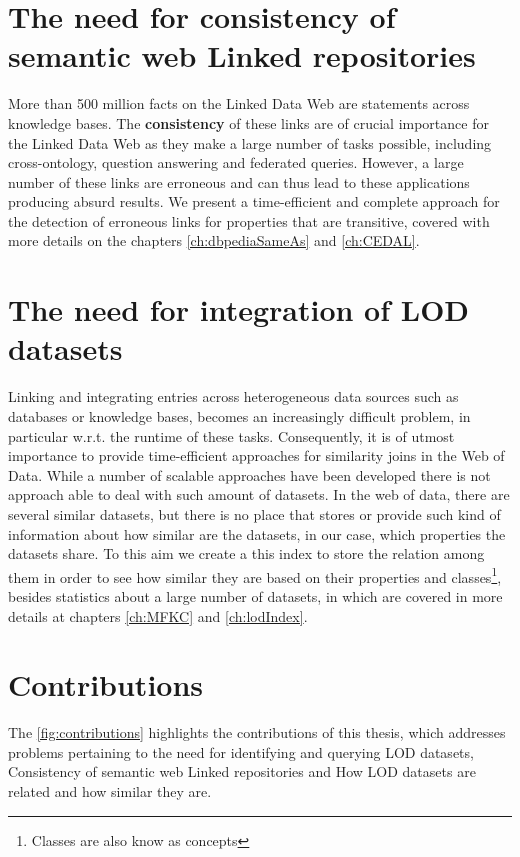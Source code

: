 \section{The need for consistency of semantic web Linked repositories}
More than 500 million facts on the Linked Data Web are statements across knowledge bases. The \textbf{consistency} of these links are of crucial importance for the Linked Data Web as they make a large number of tasks possible, including  cross-ontology, question answering and federated queries. However, a large number of these links are erroneous and can thus lead to these applications producing absurd results. We present a time-efficient and complete approach for the detection of erroneous links for properties that are transitive\cite{valdestilhasdbpediasameas, valdestilhas2017cedal}, covered with more details on the chapters \ref{ch:dbpediaSameAs} and \ref{ch:CEDAL}.

\section{The need for integration of LOD datasets}
Linking and integrating entries across heterogeneous data sources such as databases or knowledge bases, becomes an increasingly difficult problem, in particular w.r.t. the runtime of these tasks. Consequently, it is of utmost importance to provide time-efficient approaches for similarity joins in the Web of Data. While a number of scalable approaches have been developed there is not approach able to deal with such amount of datasets. In the web of data, there are several similar datasets, but there is no place that stores or provide such kind of information about how similar are the datasets, in our case, which properties the datasets share. To this aim we create a this index\cite{} to store the relation among them in order to see how similar they are based on their properties and classes\footnote{Classes are also know as concepts}, besides statistics about a large number of datasets, in which are covered in more details at chapters \ref{ch:MFKC} and \ref{ch:lodIndex}.

\section{Contributions}
The \cref{fig:contributions} highlights the contributions of this thesis, which addresses
problems pertaining to the need for identifying and querying LOD datasets, Consistency of semantic web Linked repositories and How LOD datasets are related and how similar they are.

